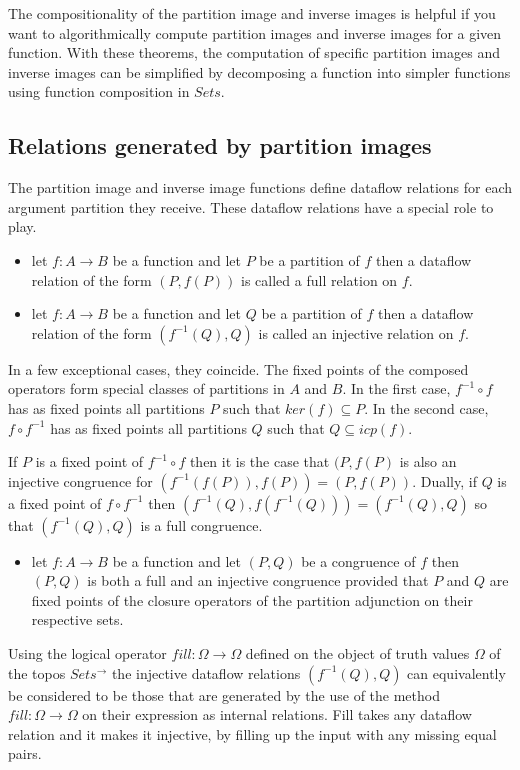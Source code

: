 \documentclass[a4paper,11pt, notitlepage]{report}
\theoremstyle{definition}
\begin{document}
The compositionality of the partition image and inverse images is helpful if you want to algorithmically compute partition images and inverse images for a given function. With these theorems, the computation of specific  partition images and inverse images can be simplified by decomposing a function into simpler functions using function composition in $Sets$.

\subsection{Relations generated by partition images}
The partition image and inverse image functions define dataflow relations for each argument partition they receive. These dataflow relations have a special role to play.

\begin{itemize}
 \item let $f: A \to B$ be a function and let $P$ be a partition of $f$ then a dataflow relation of the form $(P,f(P))$ is called a full relation on $f$.
 \item let $f: A \to B$ be a function and let $Q$ be a partition of $f$ then a dataflow relation of the form $(f^{-1}(Q),Q)$ is called an injective relation on $f$.
\end{itemize}

In a few exceptional cases, they coincide. The fixed points of the composed operators form special classes of partitions in $A$ and $B$. In the first case, $f^{-1} \circ f$ has as fixed points all partitions $P$ such that $ker(f) \subseteq P$. In the second case, $f \circ f^{-1}$ has as fixed points all partitions $Q$ such that $Q \subseteq icp(f)$.

If $P$ is a fixed point of $f^{-1} \circ f$ then it is the case that $(P,f(P)$ is also an injective congruence for $(f^{-1}(f(P)), f(P)) = (P,f(P))$. Dually, if $Q$ is a fixed point of $f \circ f^{-1}$ then $(f^{-1}(Q), f(f^{-1}(Q))) = (f^{-1}(Q), Q)$ so that $(f^{-1}(Q),Q)$ is a full congruence.

\begin{itemize}
 \item let $f: A \to B$ be a function and let $(P,Q)$ be a congruence of $f$ then $(P,Q)$ is both a full and an injective congruence provided that $P$ and $Q$ are fixed points of the closure operators of the partition adjunction on their respective sets.
\end{itemize}

Using the logical operator $fill : \Omega \to \Omega$ defined on the object of truth values $\Omega$ of the topos $Sets^{\to}$ the injective dataflow relations $(f^{-1}(Q),Q)$ can equivalently be considered to be those that are generated by the use of the method $fill : \Omega \to \Omega$ on their expression as internal relations. Fill takes any dataflow relation and it makes it injective, by filling up the input with any missing equal pairs.
\end{document}
